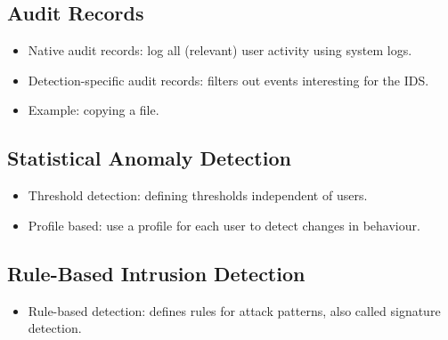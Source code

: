 \subsection{Audit Records}

\begin{frame}
  \begin{itemize}
    \item Native audit records: log all (relevant) user activity using system 
      logs.

    \item Detection-specific audit records: filters out events interesting for 
      the IDS.
      
    \item Example: copying a file.

  \end{itemize}
\end{frame}

\subsection{Statistical Anomaly Detection}

\begin{frame}
  \begin{itemize}
    \item Threshold detection: defining thresholds independent of users.

    \item Profile based: use a profile for each user to detect changes in 
      behaviour.

  \end{itemize}
\end{frame}

\subsection{Rule-Based Intrusion Detection}

\begin{frame}
  \begin{itemize}
    \item Rule-based detection: defines rules for attack patterns, also called 
      signature detection.
  \end{itemize}
\end{frame}

%

